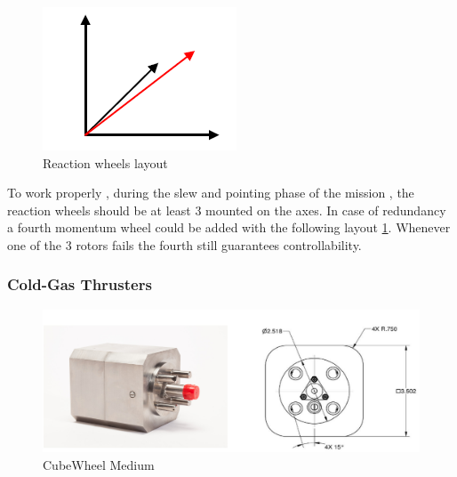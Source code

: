 \documentclass[11pt]{article}
\begin{document}
\begin{minipage}{.5\textwidth}
\begin{figure} [H]

\centering 

\includegraphics[scale=0.8]{pyramid.PNG}


\caption{ Reaction wheels layout
\cite{reaction_w}}
\label{RW}
\end{figure}
\end{minipage}
\begin{minipage}{.5\textwidth}
To work properly , during the slew and pointing phase of the mission , the reaction wheels should be at least 3 mounted on the axes. In case of redundancy a fourth momentum wheel could be added with the following layout \ref{RW}. Whenever one of the 3 rotors fails the fourth still guarantees controllability.
\end{minipage}

\subsubsection{Cold-Gas Thrusters}
\begin{figure} [H]

\centering 

\includegraphics[scale=0.6]{Vacco.PNG}


\caption{ CubeWheel Medium
\cite{Vacco}}
\label{Vacco}
\end{figure}
\end{document}
